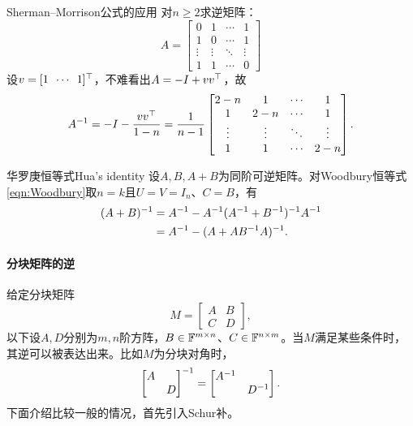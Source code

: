 \begin{example}
	{Sherman--Morrison公式的应用}{}
	对$n \geq 2$求逆矩阵：
	\[
		A = \begin{bmatrix}
			0&1&\cdots&1\\
			1&0&\cdots&1\\
			\vdots&\vdots&\ddots&\vdots\\
			1&1&\cdots&0
		\end{bmatrix}
	\]
	设$v = [1\enspace\cdots\enspace 1]^\top$，不难看出$A = -I + vv^\top$，故
	\[
		A^{-1} = -I - \frac{vv^\top}{1 - n} = \frac1{n - 1}\begin{bmatrix}
			2 - n&1&\cdots&1\\
			1&2 - n&\cdots&1\\
			\vdots&\vdots&\ddots&\vdots\\
			1&1&\cdots&2 - n
		\end{bmatrix}.
	\]
\end{example}

\begin{theorem}
	{华罗庚恒等式}{Hua's identity}
	设$A,B,A + B$为同阶可逆矩阵。对Woodbury恒等式\eqref{eqn:Woodbury}取$n = k$且$U = V = I_n$、$C = B$，有
		\begin{equation}\label{eqn:Hua}
			\begin{aligned}
				(A + B)^{-1} &= A^{-1} - A^{-1}(A^{-1} + B^{-1})^{-1} A^{-1}\\
				&= A^{-1} - (A + AB^{-1} A)^{-1}.
			\end{aligned}
		\end{equation}
\end{theorem}

\paragraph{分块矩阵的逆}

给定分块矩阵
\[
	M = \begin{bmatrix}
		A&B\\C&D
	\end{bmatrix},
\]
以下设$A,D$分别为$m,n$阶方阵，$B \in \mathbb{F}^{m\times n}$、$C \in \mathbb{F}^{n\times m}$。当$M$满足某些条件时，其逆可以被表达出来。比如$M$为分块对角时，
\begin{equation}
	\begin{bmatrix}
		A\\ &D
	\end{bmatrix}^{-1} = \begin{bmatrix}
		A^{-1}\\ &D^{-1}
	\end{bmatrix}.
\end{equation}
下面介绍比较一般的情况，首先引入Schur补。

